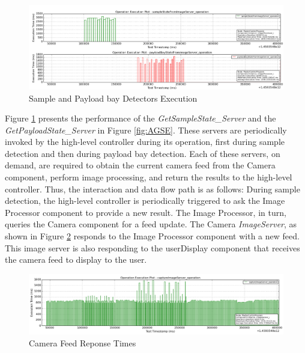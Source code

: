 \begin{figure}[t]
	\centering
	\includegraphics[width=\linewidth]{Figures/ExecPlot-sample-Bay-DetectionStateFromImageServer.png}
	\caption{Sample and Payload bay Detectors Execution}
	\label{fig:ExecPlot-sample-Bay-DetectionStateFromImageServer}	
\end{figure}

Figure \ref{fig:ExecPlot-sample-Bay-DetectionStateFromImageServer} presents the performance of the \emph{GetSampleState\_Server} and the \emph{GetPayloadState\_Server} in Figure \ref{fig:AGSE}. These servers are periodically invoked by the high-level controller during its operation, first during sample detection and then during payload bay detection. Each of these servers, on demand, are required to obtain the current camera feed from the Camera component, perform image processing, and return the results to the high-level controller. Thus, the interaction and data flow path is as follows: During sample detection, the high-level controller is periodically triggered to ask the Image Processor component to provide a new result. The Image Processor, in turn, queries the Camera component for a feed update. The Camera \emph{ImageServer}, as shown in Figure \ref{fig:ExecPlot-captureImage} responds to the Image Processor component with a new feed. This image server is also responding to the userDisplay component that receives the camera feed to display to the user. 

\begin{figure}[t]
	\centering
	\includegraphics[width=\linewidth]{Figures/ExecPlot-captureImage.png}
	\caption{Camera Feed Reponse Times}
	\label{fig:ExecPlot-captureImage}	
\end{figure}


